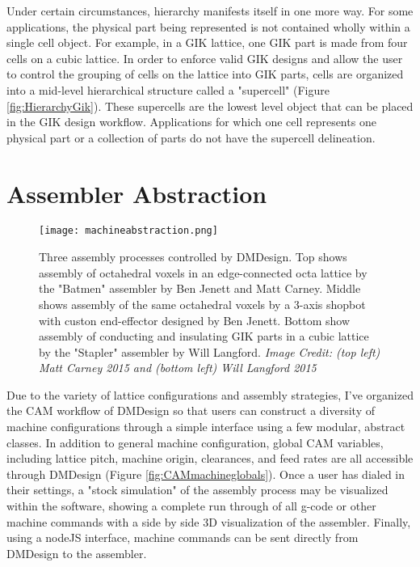 {Under certain circumstances, hierarchy manifests itself in one more way.  For some applications, the physical part being represented is not contained wholly within a single cell object.  For example, in a GIK lattice, one GIK part is made from four cells on a cubic lattice.  In order to enforce valid GIK designs and allow the user to control the grouping of cells on the lattice into GIK parts, cells are organized into a mid-level hierarchical structure called a "supercell" (Figure \ref{fig:HierarchyGik}).  These supercells are the lowest level object that can be placed in the GIK design workflow.  Applications for which one cell represents one physical part or a collection of parts do not have the supercell delineation.

\section{Assembler Abstraction}\label{sec:CAM}

\begin{figure}
  \texttt{[image: machineabstraction.png]}
  \caption{Three assembly processes controlled by DMDesign.  Top shows assembly of octahedral voxels in an edge-connected octa lattice by the "Batmen" assembler by Ben Jenett and Matt Carney.  Middle shows assembly of the same octahedral voxels by a 3-axis shopbot with custon end-effector designed by Ben Jenett.  Bottom show assembly of conducting and insulating GIK parts in a cubic lattice by the "Stapler" assembler by Will Langford.  \textit{Image Credit: (top left) Matt Carney 2015 and (bottom left) Will Langford 2015}}
  \label{fig:machineabstraction}
\end{figure}

Due to the variety of lattice configurations and assembly strategies, I've organized the CAM workflow of DMDesign so that users can construct a diversity of machine configurations through a simple interface using a few modular, abstract classes.  In addition to general machine configuration, global CAM variables, including lattice pitch, machine origin, clearances, and feed rates are all accessible through DMDesign (Figure \ref{fig:CAMmachineglobals}).  Once a user has dialed in their settings, a "stock simulation" of the assembly process may be visualized within the software, showing a complete run through of all g-code or other machine commands with a side by side 3D visualization of the assembler.  Finally, using a nodeJS interface, machine commands can be sent directly from DMDesign to the assembler.\\

}
